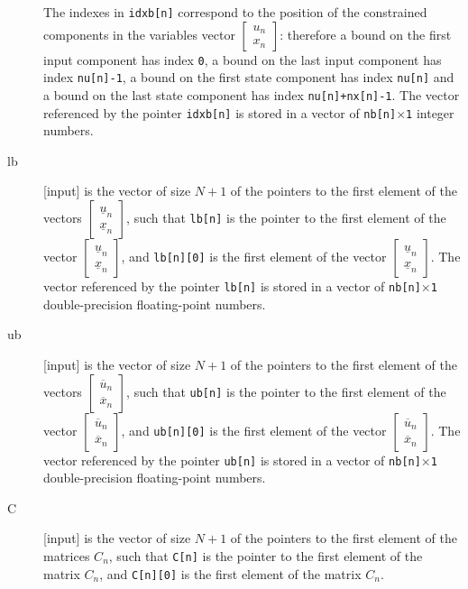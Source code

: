 \documentclass{report}
\begin{document}
\begin{description}
The indexes in {\tt idxb[n]} correspond to the position of the constrained components in the variables vector $\begin{bmatrix} u_n \\ x_n \end{bmatrix}$: therefore a bound on the first input component has index {\tt 0}, a bound on the last input component has index {\tt nu[n]-1}, a bound on the first state component has index {\tt nu[n]} and a bound on the last state component has index {\tt nu[n]+nx[n]-1}.
The vector referenced by the pointer {\tt idxb[n]} is stored in a vector of {\tt nb[n]$\times$1} integer numbers.
\item[lb] [input] is the vector of size $N+1$ of the pointers to the first element of the vectors $\begin{bmatrix} \underline u_n \\ \underline x_n \end{bmatrix}$, such that {\tt lb[n]} is the pointer to the first element of the vector $\begin{bmatrix} \underline u_n \\ \underline x_n \end{bmatrix}$, and {\tt lb[n][0]} is the first element of the vector $\begin{bmatrix} \underline u_n \\ \underline x_n \end{bmatrix}$.
The vector referenced by the pointer {\tt lb[n]} is stored in a vector of {\tt nb[n]$\times$1} double-precision floating-point numbers.
\item[ub] [input] is the vector of size $N+1$ of the pointers to the first element of the vectors $\begin{bmatrix} \overline u_n \\ \overline x_n \end{bmatrix}$, such that {\tt ub[n]} is the pointer to the first element of the vector $\begin{bmatrix} \overline u_n \\ \overline x_n \end{bmatrix}$, and {\tt ub[n][0]} is the first element of the vector $\begin{bmatrix} \overline u_n \\ \overline x_n \end{bmatrix}$.
The vector referenced by the pointer {\tt ub[n]} is stored in a vector of {\tt nb[n]$\times$1} double-precision floating-point numbers.
\item[C] [input] is the vector of size $N+1$ of the pointers to the first element of the matrices $C_n$, such that {\tt C[n]} is the pointer to the first element of the matrix $C_n$, and {\tt C[n][0]} is the first element of the matrix $C_n$.

\end{description}
\end{document}
